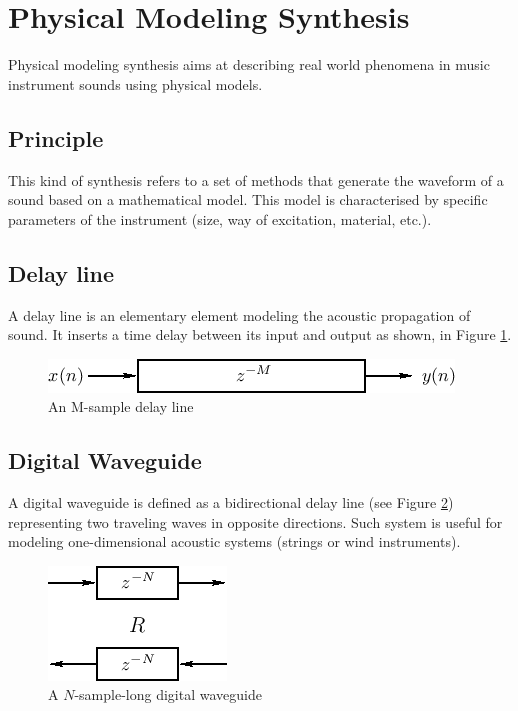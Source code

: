 \documentclass[11pt,a4paper]{article}
\begin{document}
\section{Physical Modeling Synthesis}

Physical modeling synthesis aims at describing real world phenomena in music instrument sounds using physical models.\cite{pasp}

\subsection{Principle}

This kind of synthesis refers to a set of methods that generate the waveform of a sound based on a mathematical model. This model is characterised by specific parameters of the instrument (size, way of excitation, material, etc.).

\subsection{Delay line}

A delay line is an elementary element modeling the acoustic propagation of sound. It inserts a time delay between its input and output as shown, in Figure \ref{fig:delayline}.

\begin{figure}[h]
	\centering
	\includegraphics[scale=0.5]{pictures/delayline.png}
	\caption{An M-sample delay line}
	\label{fig:delayline}
\end{figure}

\subsection{Digital Waveguide}

A digital waveguide is defined as a bidirectional delay line (see Figure \ref{fig:waveguide}) representing two traveling waves in opposite directions. Such system is useful for modeling one-dimensional acoustic systems (strings or wind instruments).

\begin{figure}
	\centering
	\includegraphics[scale=0.5]{pictures/waveguide.png}
	\caption{A $N$-sample-long digital waveguide}
	\label{fig:waveguide}
\end{figure}
\end{document}
